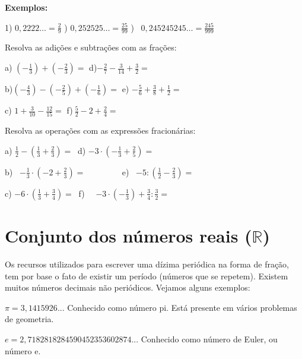 \textbf{Exemplos:}

1)  \( 0,2222 \ldots =\frac{2}{9} \)  \quad {})  \( 0,252525 \ldots =\frac{25}{99} \) \quad {})~  \( 0,245245245 \ldots =\frac{245}{999} \) 

\begin{exercicios}

	\exitem{} Resolva as adições e subtrações com as frações:

a)\textbf{  \(  \left( -\frac{1}{3} \right) + \left( -\frac{2}{3} \right) = \) \quad \quad \quad }d){\fontsize{16pt}{19.2pt}\selectfont   \( -\frac{2}{7}-\frac{3}{14}+\frac{3}{2}= \) }

b){\fontsize{16pt}{19.2pt}\selectfont   \(  \left( -\frac{4}{3} \right) - \left( -\frac{2}{5} \right) + \left( -\frac{1}{6} \right) = \) \quad e)  \( -\frac{5}{6}+\frac{3}{8}+\frac{1}{2}= \) }

c)  \( 1+\frac{3}{10}-\frac{12}{15}= \) \quad \quad \quad f){\fontsize{16pt}{19.2pt}\selectfont   \( ~\frac{5}{2}-2+\frac{2}{4}= \) }

	\exitem{} Resolva as operações com as expressões fracionárias:

a)\textbf{  \( \frac{1}{2}- \left( \frac{1}{3}+\frac{2}{3} \right) =~  \) \quad \quad \quad }d)\textbf{  \( -3 \cdot  \left( -\frac{1}{3}+\frac{2}{5} \right) =~  \) \quad }

b)~  \( -\frac{1}{3} \cdot  \left( -2+\frac{2}{3} \right) =~  \) ~~~~~~~ \quad \quad e)~  \( -5: \left( \frac{1}{2}-\frac{2}{3} \right) =~~  \) 

c)  \( -6 \cdot  \left( \frac{1}{3}+\frac{3}{4} \right) =~  \) \quad \quad \quad f)~~  \( -3 \cdot  \left( -\frac{1}{3} \right) +\frac{3}{4}:\frac{3}{2}=~  \) ~~~~~~~ 
\end{exercicios}

\section{Conjunto dos números reais ($\mathbb{R}$)}

Os recursos utilizados para escrever uma dízima periódica na forma de fração, tem por base o fato de existir um período (números que se repetem). Existem muitos números decimais não periódicos. Vejamos alguns exemplos:

$ \pi = 3,1415926$... Conhecido como número pi. Está presente em vários problemas de geometria.

$e = 2,7182818284590452353602874$... Conhecido como número de Euler, ou número e.

